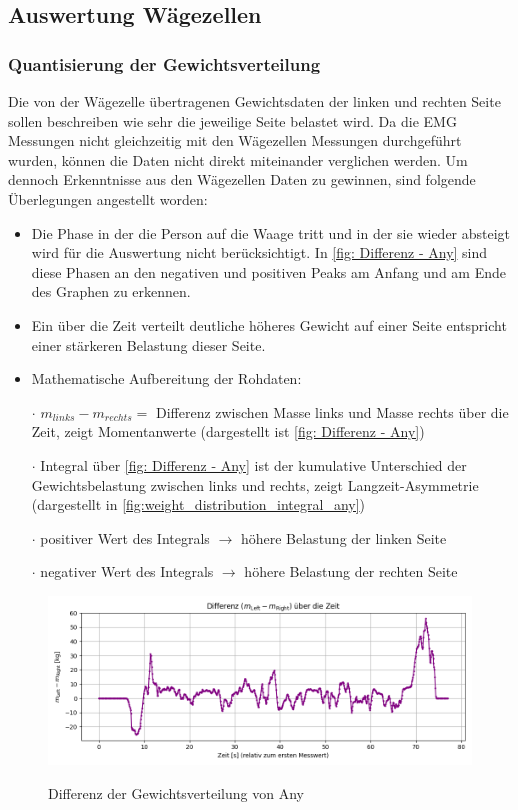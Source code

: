 \subsection{Auswertung Wägezellen}
\subsubsection{Quantisierung der Gewichtsverteilung}
Die von der Wägezelle übertragenen Gewichtsdaten der linken und rechten Seite sollen beschreiben wie sehr die jeweilige Seite belastet wird.
Da die EMG Messungen nicht gleichzeitig mit den Wägezellen Messungen durchgeführt wurden, können die Daten nicht direkt miteinander verglichen werden.
Um dennoch Erkenntnisse aus den Wägezellen Daten zu gewinnen, sind folgende Überlegungen angestellt worden:
\begin{itemize}
  \item Die Phase in der die Person auf die Waage tritt und in der sie wieder absteigt wird für die Auswertung nicht berücksichtigt.
  In \autoref{fig: Differenz - Any} sind diese Phasen an den negativen und positiven Peaks am Anfang und am Ende des Graphen zu erkennen.
  \item Ein über die Zeit verteilt deutliche höheres Gewicht auf einer Seite entspricht einer stärkeren Belastung dieser Seite.
  \item Mathematische Aufbereitung der Rohdaten:
    \item[$\cdot$] $m_{links} - m_{rechts} =$ Differenz zwischen Masse links und Masse rechts über die Zeit, zeigt Momentanwerte (dargestellt ist \autoref{fig: Differenz - Any})
    \item[$\cdot$] Integral über \autoref{fig: Differenz - Any} ist der kumulative Unterschied der Gewichtsbelastung zwischen links und rechts, zeigt Langzeit-Asymmetrie (dargestellt in \autoref{fig:weight_distribution_integral_any})
    \item[$\cdot$] positiver Wert des Integrals $\rightarrow$ höhere Belastung der linken Seite
    \item[$\cdot$] negativer Wert des Integrals $\rightarrow$ höhere Belastung der rechten Seite
\end{itemize}

\begin{figure}
  \centering
  \includegraphics[width=0.7\linewidth]{img/pyplots/Differenz - Any.png}\\
  \caption{Differenz der Gewichtsverteilung von Any}
  \label{fig: Differenz - Any}
\end{figure}

